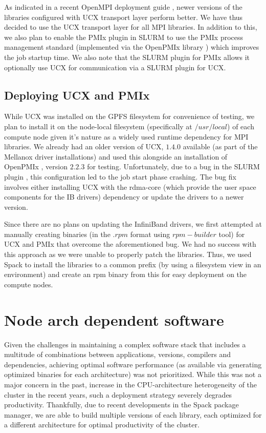 \documentclass[sigconf,authordraft]{acmart}
\begin{document}
As indicated in a recent OpenMPI deployment guide \cite{openmpi_deployment_tuning}, newer versions of the libraries configured with UCX transport layer perform better. We have thus decided to use the UCX transport layer for all MPI libraries. In addition to this, we also plan to enable the PMIx plugin \cite{slurm_pmix_sc17,slurm_pmix_2019} in SLURM to use the PMIx process management standard \cite{pmix,pmix_website} (implemented via the OpenPMIx library \cite{openpmix_website}) which improves the job startup time. We also note that the SLURM plugin for PMIx allows it optionally use UCX for communication via a SLURM plugin for UCX.

\subsection{Deploying UCX and PMIx}
While UCX was installed on the GPFS filesystem for convenience of testing, we plan to install it on the node-local filesystem (specifically at $/usr/local$) of each compute node given it's nature as a widely used runtime dependency for MPI libraries. We already had an older version of UCX, $1.4.0$ available (as part of the Mellanox driver installations) and used this alongside an installation of OpenPMIx \cite{openpmix_website}, version $2.2.3$ for testing. Unfortunately, due to a bug in the SLURM plugin \cite{slurm_ucx_bug}, this configuration led to the job start phase crashing. The bug fix involves either installing UCX with the rdma-core \cite{rdmacore_repository}(which provide the user space components for the IB drivers) dependency or update the drivers to a newer version.

Since there are no plans on updating the InfiniBand drivers, we first attempted at manually creating binaries (in the $.rpm$ format using $rpm-builder$ tool) for UCX and PMIx that overcome the aforementioned bug. We had no success with this approach as we were unable to properly patch the libraries. Thus, we used Spack \cite{spack} to install the libraries to a common prefix (by using a filesystem view in an environment) and create an rpm binary from this for easy deployment on the compute nodes.

\section{Node arch dependent software}

Given the challenges in maintaining a complex software stack that includes a multitude of combinations between applications, versions, compilers and dependencies, achieving optimal software performance (as available via generating optimized binaries for each architecture) was not prioritized. While this was not a major concern in the past, increase in the CPU-architecture heterogeneity of the cluster in the recent years, such a deployment strategy severely degrades productivity. Thankfully, due to recent developments in the Spack package manager, we are able to build multiple versions of each library, each optimized for a different architecture for optimal productivity of the cluster. 
\end{document}
